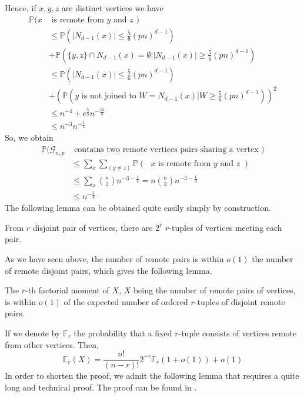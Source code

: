 	Hence, if $x, y, z$ are distinct vertices we have
	\begin{align}
		\mathbb{P}(x&\text{ is remote from $y$ and $z$ }) 						\\	
		&\leq \mathbb{P}(|N_{d-1}(x)|\leq \frac{5}{6} (pn)^{d-1}) 					\\
		&+\mathbb{P}(\{y, z\} \cap N_{d-1}(x) = \emptyset | |N_{d-1}(x)| \geq \frac{5}{6}(pn)^{d-1} )	\\
		&\leq \mathbb{P}(|N_{d-1}(x)|\leq \frac{5}{6} (pn)^{d-1}) 					\\				
		&+(\mathbb{P}(\text{$y$ is not joined to } W = N_{d-1}(x) | W \geq \frac{5}{6} (pn)^{d-1}))^2	\\
		&\leq n^{-4} + c^{\frac{5}{3}}n^{-\frac{10}{3}}							\\
		&\leq n^{-3}n^{-\frac{1}{4}}
	\end{align}
	So, we obtain
	\begin{align}
		\mathbb{P}(\mathcal{G}_{n, p} &\text{ contains two remote vertices pairs sharing a vertex })	\\
			&\leq \sum_x\sum_{(y \neq z)}\mathbb{P}(\text{ $x$ is remote from $y$ and $z$ })		\\
			&\leq \sum_x \binom{n}{2}n^{-3-\frac{1}{4}} = n\binom{n}{2}n^{-3-\frac{1}{4}}		\\
			&\leq n^{-\frac{1}{4}}
	\end{align}
	The following lemma can be obtained quite easily simply by construction.
	\begin{lemma}
		From $r$ disjoint pair of vertices, there are $2^r$ $r$-tuples of vertices meeting each pair.
	\end{lemma}
	As we have seen above, the number of remote pairs is within $o(1)$ the number of remote disjoint pairs, which gives the following lemma.
	\begin{lemma}
		The $r$-th factorial moment of $X$, $X$ being the number of remote pairs of vertices, is within $o(1)$ of the expected number of ordered $r$-tuples of disjoint remote pairs.
	\end{lemma}
	If we denote by $\mathbb{F}_r$ the probability that a fixed $r$-tuple consists of vertices remote from other vertices.
	Then,
	\begin{equation}
		\mathbb{E}_r(X) = \frac{n!}{(n-r)!}2^{-r}\mathbb{F}_r(1+o(1)) + o(1)
	\end{equation}
	In order to shorten the proof, we admit the following lemma that requires a quite long and technical proof. The proof can be found in \cite{Bollob81}.
